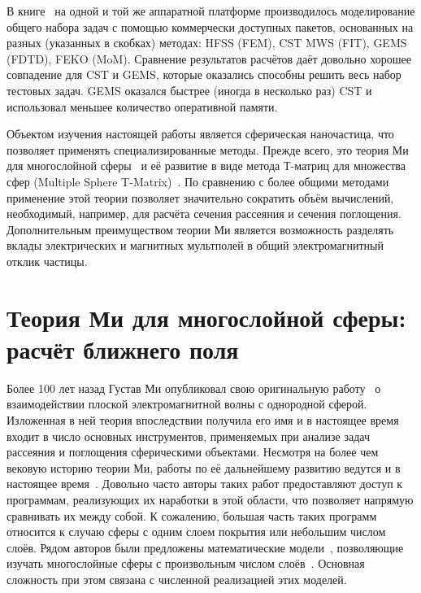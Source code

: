 В книге~\cite{Yu-Advanced-FDTD-2011} на одной и той же аппаратной
платформе производилось моделирование общего набора задач с помощью
коммерчески доступных пакетов, основанных на разных
(указанных в скобках) методах: HFSS (FEM), CST MWS (FIT), GEMS (FDTD),
FEKO (MoM). Сравнение результатов расчётов даёт довольно хорошее
совпадение для CST и GEMS, которые оказались способны решить весь
набор тестовых задач. GEMS оказался быстрее (иногда в несколько раз)
CST и использовал меньшее количество оперативной памяти.

Объектом изучения настоящей работы является сферическая наночастица,
что позволяет применять специализированные методы. Прежде
всего, это теория Ми для многослойной сферы~\cite{Yang-2003} и её
развитие в виде метода Т-матриц для множества сфер (Multiple Sphere
T-Matrix)~\cite{MacKowski-2012}.  По сравнению с более общими методами
применение этой теории позволяет значительно сократить объём
вычислений, необходимый, например, для расчёта сечения рассеяния и
сечения поглощения.  Дополнительным преимуществом теории Ми является
возможность разделять вклады электрических и магнитных мультполей в
общий электромагнитный отклик частицы.


\section{Теория Ми для многослойной сферы: расчёт ближнего поля}
\label{sec:Mie}

Более 100 лет назад Густав Ми опубликовал свою оригинальную
работу~\cite{Mie-1908} о взаимодействии плоской электромагнитной волны
с однородной сферой.  Изложенная в ней теория впоследствии получила
его имя и в настоящее время входит в число основных инструментов,
применяемых при анализе задач рассеяния и поглощения сферическими
объектами.  Несмотря на более чем вековую историю теории Ми, работы по
её дальнейшему развитию ведутся и в настоящее время~\cite{Suzuki-2008,
  MacKowski-2012, Lerme-2000, Xu-2005, Li-2006, Gogoi-2010,
  Santiago-2011}.  Довольно часто авторы таких работ предоставляют
доступ к программам, реализующих их наработки в этой области, что
позволяет напрямую сравнивать их между собой.  К сожалению, большая
часть таких программ относится к случаю сферы с одним слоем покрытия
или небольшим числом слоёв. Рядом авторов были
предложены математические модели~\cite{Yang-2003,
  Pena-scattnlay-2009}, позволяющие изучать многослойные сферы с
произвольным числом слоёв~\cite{Sheehan-2013,Selmke-2012}.  Основная
сложность при этом связана с численной реализацией этих моделей.

